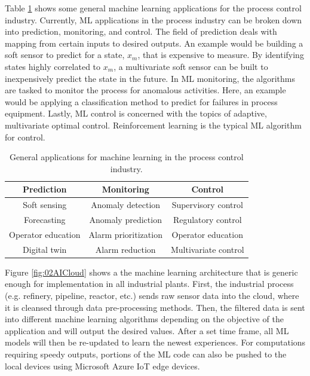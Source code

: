 Table \ref{tab:2MLApplications} shows some general machine learning applications for the process control industry. Currently, ML applications in the process industry can be broken down into prediction, monitoring, and control.  The field of prediction deals with mapping from certain inputs to desired outputs. An example would be building a soft sensor to predict for a state, $x_{m}$, that is expensive to measure.  By identifying states highly correlated to $x_{m}$, a multivariate soft sensor can be built to inexpensively predict the state in the future. In ML monitoring, the algorithms are tasked to monitor the process for anomalous activities. Here, an example would be applying a classification method to predict for failures in process equipment.  Lastly, ML control is concerned with the topics of adaptive, multivariate optimal control. Reinforcement learning is the typical ML algorithm for control.  

\begin{table}[h]
    \centering
    {
    \begin{tabular}{c|c|c}
    Prediction & Monitoring & Control \\ \hline
    Soft sensing & Anomaly detection & Supervisory control \\
    Forecasting  & Anomaly prediction & Regulatory control \\
    Operator education  & Alarm prioritization & Operator education \\
    Digital twin  & Alarm reduction & Multivariate control\\
    \end{tabular}}
    \caption{General applications for machine learning in the process control industry.}
    \label{tab:2MLApplications}
\end{table}

 Figure \ref{fig:02AICloud} shows a the machine learning architecture that is generic enough for implementation in all industrial plants. First, the industrial process (e.g. refinery, pipeline, reactor, etc.) sends raw sensor data into the cloud, where it is cleansed through data pre-processing methods.  Then, the filtered data is sent into different machine learning algorithms depending on the objective of the application and will output the desired values.  After a set time frame, all ML models will then be re-updated to learn the newest experiences. For computations requiring speedy outputs, portions of the ML code can also be pushed to the local devices using Microsoft Azure IoT edge devices. 

